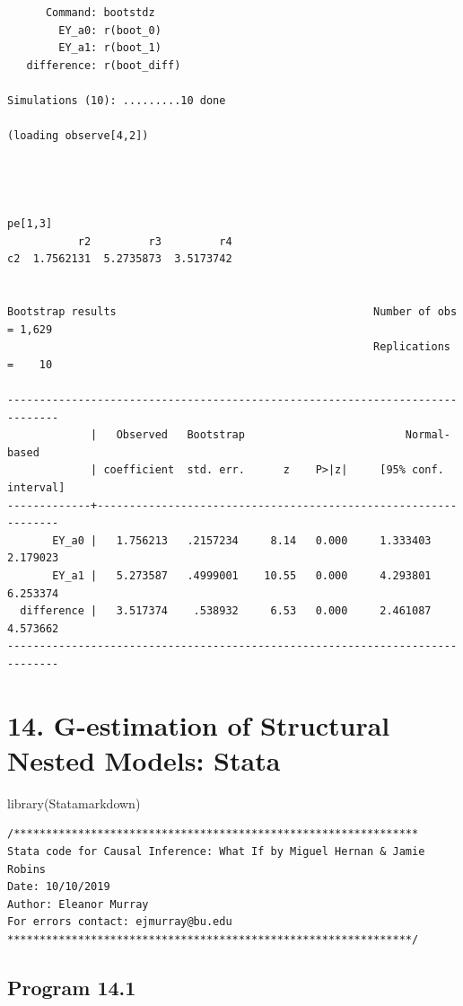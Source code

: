 \documentclass[
  10pt,
  a4paper,
]{book}
\newenvironment{Shaded}{\begin{snugshade}}{\end{snugshade}}
\newcommand{\FunctionTok}[1]{\textcolor[rgb]{0.28,0.35,0.67}{#1}}
\newcommand{\NormalTok}[1]{\textcolor[rgb]{0.00,0.46,0.62}{#1}}
\begin{document}
\begin{verbatim}
      Command: bootstdz
        EY_a0: r(boot_0)
        EY_a1: r(boot_1)
   difference: r(boot_diff)

Simulations (10): .........10 done

(loading observe[4,2])




pe[1,3]
           r2         r3         r4
c2  1.7562131  5.2735873  3.5173742


Bootstrap results                                        Number of obs = 1,629
                                                         Replications  =    10

------------------------------------------------------------------------------
             |   Observed   Bootstrap                         Normal-based
             | coefficient  std. err.      z    P>|z|     [95% conf. interval]
-------------+----------------------------------------------------------------
       EY_a0 |   1.756213   .2157234     8.14   0.000     1.333403    2.179023
       EY_a1 |   5.273587   .4999001    10.55   0.000     4.293801    6.253374
  difference |   3.517374    .538932     6.53   0.000     2.461087    4.573662
------------------------------------------------------------------------------
\end{verbatim}

\chapter*{14. G-estimation of Structural Nested Models: Stata}\label{g-estimation-of-structural-nested-models-stata}

\begin{Shaded}
\begin{Highlighting}[]
\FunctionTok{library}\NormalTok{(Statamarkdown)}
\end{Highlighting}
\end{Shaded}

\begin{verbatim}
/***************************************************************
Stata code for Causal Inference: What If by Miguel Hernan & Jamie Robins
Date: 10/10/2019
Author: Eleanor Murray 
For errors contact: ejmurray@bu.edu
***************************************************************/
\end{verbatim}

\section{Program 14.1}\label{program-14.1-1}
\end{document}
